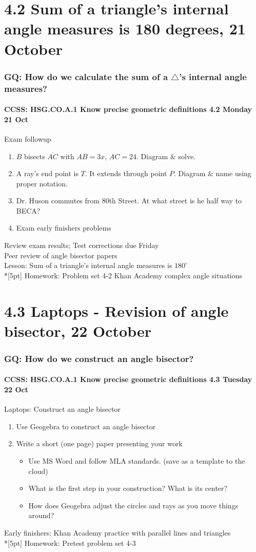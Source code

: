 \documentclass{beamer}
\begin{document}
\section{4.2 Sum of a triangle's internal angle measures is 180 degrees, 21 October}
  \frame
  {
    \frametitle{GQ: How do we calculate the sum of a $\triangle$'s internal angle measures?}
    \framesubtitle{CCSS: HSG.CO.A.1 Know precise geometric definitions \hfill \alert{4.2 Monday 21 Oct}}

    \begin{block}{Exam followup}
    \begin{enumerate}
      \item $B$ bisects $\overline{AC}$ with $AB=3x$, $AC=24$. Diagram \& solve.
      \item A ray's end point is $T$. It extends through point $P$. Diagram \& name using proper notation.
      \item Dr. Huson commutes from 80th Street. At what street is he half way to BECA?
      \item Exam early finishers problems
    \end{enumerate}
    \end{block}
    Review exam results; Test corrections due \alert{Friday}\\
    Peer review of angle bisector papers \\
    Lesson: Sum of a triangle's internal angle measures is $180^\circ$ \\*[5pt]
    Homework: Problem set 4-2 Khan Academy complex angle situations
  }

\section{4.3 Laptops - Revision of angle bisector, 22 October}
  \frame
  {
    \frametitle{GQ: How do we construct an angle bisector?}
    \framesubtitle{CCSS: HSG.CO.A.1 Know precise geometric definitions \hfill \alert{4.3 Tuesday 22 Oct}}

    \begin{block}{Laptops: Construct an angle bisector}
    \begin{enumerate}
      \item Use Geogebra to construct an angle bisector
      \item Write a short (one page) paper presenting your work
      \begin{itemize}
        \item Use MS Word and follow MLA standards. (save as a template to the cloud)
        \item What is the first step in your construction? What is its center?
        \item How does Geogebra adjust the circles and rays as you move things around?
      \end{itemize}
    \end{enumerate}
    \end{block}
    Early finishers:  Khan Academy practice with parallel lines and triangles \\*[5pt]
    Homework: Pretest problem set 4-3
  }
\end{document}
